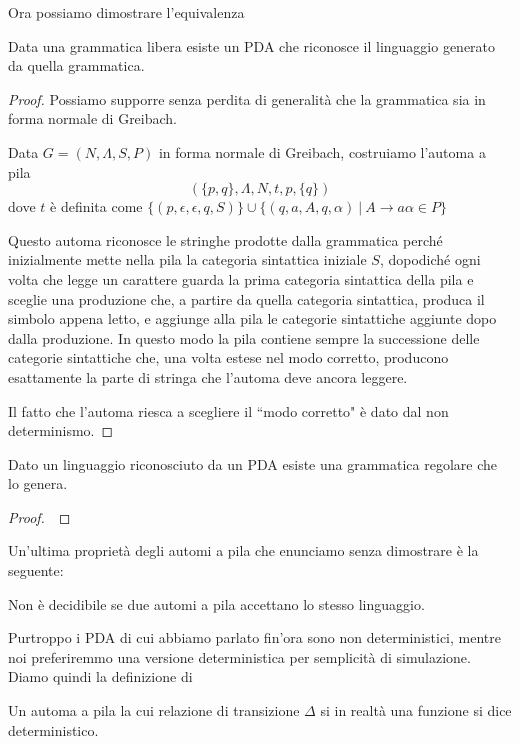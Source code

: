\documentclass[12pt]{article}
\numberwithin{theorem}{subsection}
\begin{document}
Ora possiamo dimostrare l'equivalenza
\begin{lemma}
	Data una grammatica libera esiste un PDA che riconosce il linguaggio generato da quella grammatica.
\end{lemma}
\begin{proof}
	Possiamo supporre senza perdita di generalità che la grammatica sia in forma normale di Greibach.
	
	Data $G = (N, \Lambda, S, P)$ in forma normale di Greibach, costruiamo l'automa a pila
	\[
	(\{ p, q \}, \Lambda, N, t, p, \{ q \})
	\]
	dove $t$ è definita come $\{(p, \epsilon, \epsilon, q, S) \} \cup \{ (q, a, A, q, \alpha) \ \vert \ A \rightarrow a\alpha \in P \}$
	
	Questo automa riconosce le stringhe prodotte dalla grammatica perché inizialmente mette nella pila la categoria sintattica iniziale $S$, dopodiché ogni volta che legge un carattere guarda la prima categoria sintattica della pila e sceglie una produzione che, a partire da quella categoria sintattica, produca il simbolo appena letto, e aggiunge alla pila le categorie sintattiche aggiunte dopo dalla produzione. In questo modo la pila contiene sempre la successione delle categorie sintattiche che, una volta estese nel modo corretto, producono esattamente la parte di stringa che l'automa deve ancora leggere.
	
	Il fatto che l'automa riesca a scegliere il ``modo corretto" è dato dal non determinismo.
\end{proof}

\begin{lemma}
	Dato un linguaggio riconosciuto da un PDA esiste una grammatica regolare che lo genera.
\end{lemma}
\begin{proof}
	$\,$
\end{proof}

Un'ultima proprietà degli automi a pila che enunciamo senza dimostrare è la seguente:
\begin{prop}
	Non è decidibile se due automi a pila accettano lo stesso linguaggio.
\end{prop}

Purtroppo i PDA di cui abbiamo parlato fin'ora sono non deterministici, mentre noi preferiremmo una versione deterministica per semplicità di simulazione. Diamo quindi la definizione di
\begin{definition}
	Un automa a pila la cui relazione di transizione $\Delta$ si in realtà una funzione si dice deterministico.
\end{definition}
\end{document}

